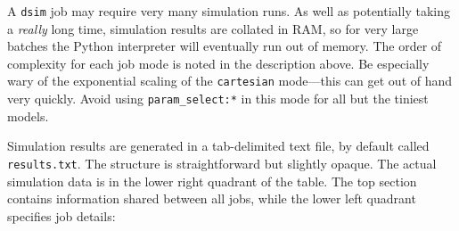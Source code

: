 \documentclass[a4paper,11pt]{article}
\begin{document}
A \texttt{dsim} job may require very many simulation runs. As well as potentially taking a \textit{really} long time, simulation results are collated in RAM, so for very large batches the Python interpreter will eventually run out of memory. The order of complexity for each job mode is noted in the description above. Be especially wary of the exponential scaling of the \texttt{cartesian} mode---this can get out of hand very quickly. Avoid using \texttt{param\_select:*} in this mode for all but the tiniest models.

Simulation results are generated in a tab-delimited text file, by default called \texttt{results.txt}. The structure is straightforward but slightly opaque. The actual simulation data is in the lower right quadrant of the table. The top section contains information shared between all jobs, while the lower left quadrant specifies job details:
\end{document}
